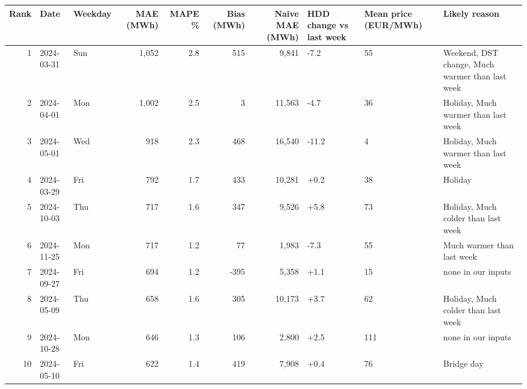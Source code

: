 \begin{tabular}{rllrrrrlll}
\toprule
Rank & Date & Weekday & MAE (MWh) & MAPE \% & Bias (MWh) & Naive MAE (MWh) & HDD change vs last week & Mean price (EUR/MWh) & Likely reason \\
\midrule
1 & 2024-03-31 & Sun & 1,052 & 2.8 & 515 & 9,841 & -7.2 & 55 & Weekend, DST change, Much warmer than last week \\
2 & 2024-04-01 & Mon & 1,002 & 2.5 & 3 & 11,563 & -4.7 & 36 & Holiday, Much warmer than last week \\
3 & 2024-05-01 & Wed & 918 & 2.3 & 468 & 16,540 & -11.2 & 4 & Holiday, Much warmer than last week \\
4 & 2024-03-29 & Fri & 792 & 1.7 & 433 & 10,281 & +0.2 & 38 & Holiday \\
5 & 2024-10-03 & Thu & 717 & 1.6 & 347 & 9,526 & +5.8 & 73 & Holiday, Much colder than last week \\
6 & 2024-11-25 & Mon & 717 & 1.2 & 77 & 1,983 & -7.3 & 55 & Much warmer than last week \\
7 & 2024-09-27 & Fri & 694 & 1.2 & -395 & 5,358 & +1.1 & 15 & none in our inputs \\
8 & 2024-05-09 & Thu & 658 & 1.6 & 305 & 10,173 & +3.7 & 62 & Holiday, Much colder than last week \\
9 & 2024-10-28 & Mon & 646 & 1.3 & 106 & 2,800 & +2.5 & 111 & none in our inputs \\
10 & 2024-05-10 & Fri & 622 & 1.4 & 419 & 7,908 & +0.4 & 76 & Bridge day \\
\bottomrule
\end{tabular}
